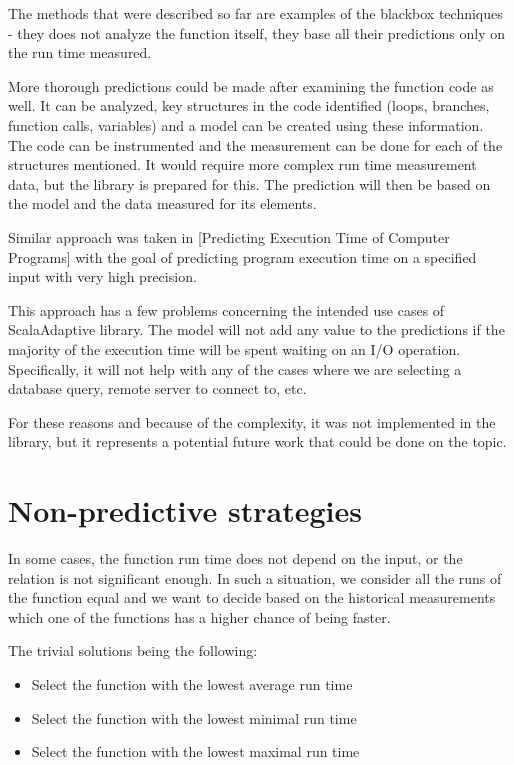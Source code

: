 The methods that were described so far are examples of the blackbox techniques - they does not analyze the function itself, they base all their predictions only on the run time measured.

More thorough predictions could be made after examining the function code as well. It can be analyzed, key structures in the code identified (loops, branches, function calls, variables) and a model can be created using these information. The code can be instrumented and the measurement can be done for each of the structures mentioned. It would require more complex run time measurement data, but the library is prepared for this. The prediction will then be based on the model and the data measured for its elements.

Similar approach was taken in [Predicting Execution Time of Computer Programs] with the goal of predicting program execution time on a specified input with very high precision.

This approach has a few problems concerning the intended use cases of ScalaAdaptive library. The model will not add any value to the predictions if the majority of the execution time will be spent waiting on an I/O operation. Specifically, it will not help with any of the cases where we are selecting a database query, remote server to connect to, etc.

For these reasons and because of the complexity, it was not implemented in the library, but it represents a potential future work that could be done on the topic.

\section{Non-predictive strategies}
\label{sec:non_predictive_strategies}

In some cases, the function run time does not depend on the input, or the relation is not significant enough. In such a situation, we consider all the runs of the function equal and we want to decide based on the historical measurements which one of the functions has a higher chance of being faster.

The trivial solutions being the following:
\begin{itemize}
	\item Select the function with the lowest average run time
	\item Select the function with the lowest minimal run time
	\item Select the function with the lowest maximal run time
\end{itemize}

